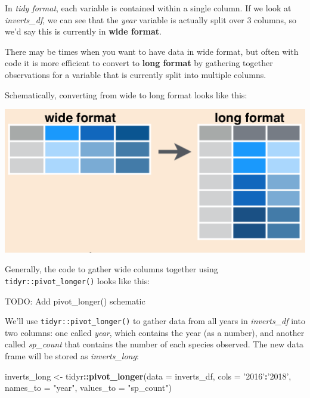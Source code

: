 \documentclass[]{book}
\newenvironment{Shaded}{\begin{snugshade}}{\end{snugshade}}
\newcommand{\DataTypeTok}[1]{\textcolor[rgb]{0.13,0.29,0.53}{#1}}
\newcommand{\KeywordTok}[1]{\textcolor[rgb]{0.13,0.29,0.53}{\textbf{#1}}}
\newcommand{\NormalTok}[1]{#1}
\newcommand{\OperatorTok}[1]{\textcolor[rgb]{0.81,0.36,0.00}{\textbf{#1}}}
\newcommand{\StringTok}[1]{\textcolor[rgb]{0.31,0.60,0.02}{#1}}
\begin{document}
In \emph{tidy format}, each variable is contained within a single column. If we look at \emph{inverts\_df}, we can see that the \emph{year} variable is actually split over 3 columns, so we'd say this is currently in \textbf{wide format}.

There may be times when you want to have data in wide format, but often with code it is more efficient to convert to \textbf{long format} by gathering together observations for a variable that is currently split into multiple columns.

Schematically, converting from wide to long format looks like this:

\includegraphics{img/tidyr_pivot_longer.png}

Generally, the code to gather wide columns together using \texttt{tidyr::pivot\_longer()} looks like this:

TODO: Add pivot\_longer() schematic

We'll use \texttt{tidyr::pivot\_longer()} to gather data from all years in \emph{inverts\_df} into two columns: one called \emph{year}, which contains the year (as a number), and another called \emph{sp\_count} that contains the number of each species observed. The new data frame will be stored as \emph{inverts\_long}:

\begin{Shaded}
\begin{Highlighting}[]
\NormalTok{inverts_long <-}\StringTok{ }\NormalTok{tidyr}\OperatorTok{::}\KeywordTok{pivot_longer}\NormalTok{(}\DataTypeTok{data =}\NormalTok{ inverts_df, }
                                    \DataTypeTok{cols =} \StringTok{'2016'}\OperatorTok{:}\StringTok{'2018'}\NormalTok{,}
                                    \DataTypeTok{names_to =} \StringTok{"year"}\NormalTok{,}
                                    \DataTypeTok{values_to =} \StringTok{"sp_count"}\NormalTok{)}
\end{Highlighting}
\end{Shaded}
\end{document}
